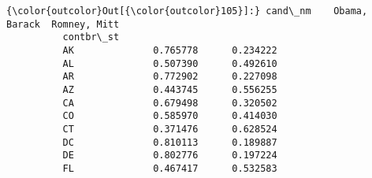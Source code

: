 \documentclass{article}
\begin{document}
            \begin{Verbatim}[commandchars=\\\{\}]
{\color{outcolor}Out[{\color{outcolor}105}]:} cand\_nm    Obama, Barack  Romney, Mitt
          contbr\_st                             
          AK              0.765778      0.234222
          AL              0.507390      0.492610
          AR              0.772902      0.227098
          AZ              0.443745      0.556255
          CA              0.679498      0.320502
          CO              0.585970      0.414030
          CT              0.371476      0.628524
          DC              0.810113      0.189887
          DE              0.802776      0.197224
          FL              0.467417      0.532583
\end{Verbatim}
        

    
    
    
    
\end{document}
